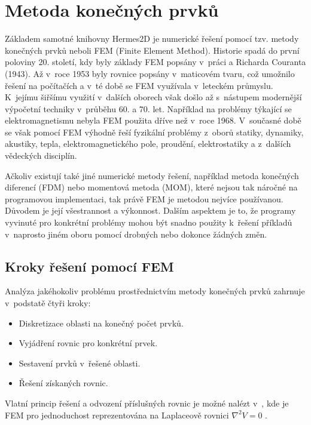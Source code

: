 \section{Metoda konečných prvků}
Základem samotné knihovny Hermes2D je numerické řešení pomocí tzv. metody konečných prvků neboli FEM (Finite Element Method). Historie spadá do první poloviny 20. století, kdy byly základy FEM popsány v~práci a Richarda Couranta (1943). Až v~roce 1953 byly rovnice popsány v~maticovém tvaru, což umožnilo řešení na počítačích a v~té době se FEM využívala v~leteckém průmyslu. K~jejímu šiřšímu využití v~dalších oborech však došlo až s~nástupem modernější výpočetní techniky v~průběhu 60. a 70. let. Například na problémy týkající se elektromagnetismu nebyla FEM použita dříve než v~roce 1968. V~současné době se však pomocí FEM výhodně řeší fyzikální problémy z~oborů statiky, dynamiky, akustiky, tepla, elektromagnetického pole, proudění, elektrostatiky a z~dalších vědeckých disciplín. 

Ačkoliv existují také jiné numerické metody řešení, například metoda konečných diferencí (FDM) nebo momentová metoda (MOM), které nejsou tak náročné na programovou implementaci, tak právě FEM je metodou nejvíce používanou. Důvodem je její všestrannost a výkonnost. Dalším aspektem je to, že programy vyvinuté pro konkrétní problémy mohou být snadno použity k~řešení příkladů v~naprosto jiném oboru pomocí drobných nebo dokonce žádných změn.

\subsection{Kroky řešení pomocí FEM}
Analýza jakéhokoliv problému prostřednictvím metody konečných prvků zahrnuje v~podstatě čtyři kroky:
\begin{itemize}
\item {Diskretizace oblasti na konečný počet prvků.}
\item {Vyjádření rovnic pro konkrétní prvek.}
\item {Sestavení prvků v~řešené oblasti.}
\item {Řešení získaných rovnic.}
\end{itemize}
Vlatní princip řešení a odvození příslušných rovnic je možné nalézt v~\cite[kap. 6.2]{num}, kde je FEM pro jednoduchost reprezentována na Laplaceově rovnici $\nabla^{2}V = 0$ .

